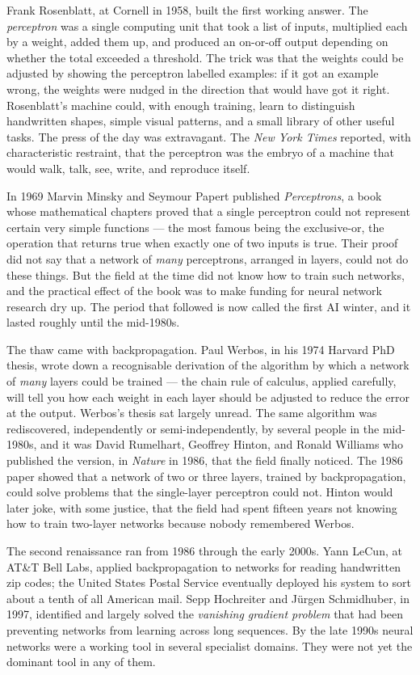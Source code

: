 Frank Rosenblatt, at Cornell in 1958, built the first working
answer. The \emph{perceptron} was a single computing unit that
took a list of inputs, multiplied each by a weight, added them
up, and produced an on-or-off output depending on whether the
total exceeded a threshold. The trick was that the weights
could be adjusted by showing the perceptron labelled examples:
if it got an example wrong, the weights were nudged in the
direction that would have got it right. Rosenblatt's machine
could, with enough training, learn to distinguish handwritten
shapes, simple visual patterns, and a small library of other
useful tasks. The press of the day was extravagant. The
\emph{New York Times} reported, with characteristic restraint,
that the perceptron was the embryo of a machine that would walk,
talk, see, write, and reproduce itself.

In 1969 Marvin Minsky and Seymour Papert published \emph{Perceptrons},
a book whose mathematical chapters proved that a single perceptron
could not represent certain very simple functions --- the most
famous being the exclusive-or, the operation that returns true
when exactly one of two inputs is true. Their proof did not say
that a network of \emph{many} perceptrons, arranged in layers,
could not do these things. But the field at the time did not
know how to train such networks, and the practical effect of the
book was to make funding for neural network research dry up.
The period that followed is now called the first AI winter, and
it lasted roughly until the mid-1980s.

The thaw came with backpropagation. Paul Werbos, in his 1974
Harvard PhD thesis, wrote down a recognisable derivation of the
algorithm by which a network of \emph{many} layers could be
trained --- the chain rule of calculus, applied carefully, will
tell you how each weight in each layer should be adjusted to
reduce the error at the output. Werbos's thesis sat largely
unread. The same algorithm was rediscovered, independently or
semi-independently, by several people in the mid-1980s, and it
was David Rumelhart, Geoffrey Hinton, and Ronald Williams who
published the version, in \emph{Nature} in 1986, that the field
finally noticed. The 1986 paper showed that a network of two or
three layers, trained by backpropagation, could solve problems
that the single-layer perceptron could not. Hinton would later
joke, with some justice, that the field had spent fifteen years
not knowing how to train two-layer networks because nobody
remembered Werbos.

The second renaissance ran from 1986 through the early 2000s.
Yann LeCun, at AT\&T Bell Labs, applied backpropagation to
networks for reading handwritten zip codes; the United States
Postal Service eventually deployed his system to sort about a
tenth of all American mail. Sepp Hochreiter and J\"urgen
Schmidhuber, in 1997, identified and largely solved the
\emph{vanishing gradient problem} that had been preventing
networks from learning across long sequences. By the late
1990s neural networks were a working tool in several specialist
domains. They were not yet the dominant tool in any of them.

